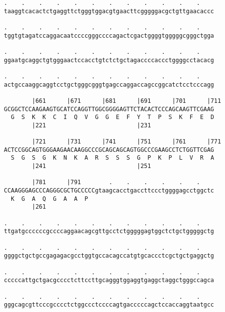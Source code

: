 \documentclass{article}
\begin{document}
\begin{Verbatim}
.    .    .    .    .    .    .    .    .    .    .    .    
taaggtcacactctgaggttctgggtggacgtgaacttcgggggacgctgttgaacaccc
                                                            
.    .    .    .    .    .    .    .    .    .    .    .    
tggtgtagatccaggacaatccccgggccccagactcgactggggtgggggcgggctgga
                                                            
.    .    .    .    .    .    .    .    .    .    .    .    
ggaatgcaggctgtgggaactccacctgtctctgctagaccccaccctggggcctacacg
                                                            
.    .    .    .    .    .    .    .    .    .    .    .    
actgccaaggcaggtcctgctgggcgggtgagccaggaccagccggcatctcctcccagg
                                                            
        |661      |671      |681      |691      |701      |711
GCGGCTCCAAGAAGTGCATCCAGGTTGGCGGGGAGTTCTACACTCCCAGCAAGTTCGAAG
  G  S  K  K  C  I  Q  V  G  G  E  F  Y  T  P  S  K  F  E  D
        |221                          |231                  
  
        |721      |731      |741      |751      |761      |771
ACTCCGGCAGTGGGAAGAACAAGGCCCGCAGCAGCAGTGGCCCGAAGCCTCTGGTTCGAG
  S  G  S  G  K  N  K  A  R  S  S  S  G  P  K  P  L  V  R  A
        |241                          |251                  
  
        |781      |791        .    .    .    .    .    .    
CCAAGGGAGCCCAGGGCGCTGCCCCCgtaagcacctgaccttccctggggagcctggctc
  K  G  A  Q  G  A  A  P                                    
        |261                                                
  
.    .    .    .    .    .    .    .    .    .    .    .    
ttgatgccccccgccccaggaacagcgttgcctctgggggagtggctctgctgggggctg
                                                            
.    .    .    .    .    .    .    .    .    .    .    .    
ggggctgctgccgagagacgcctggtgccacagccatgtgcaccctcgctgctgaggctg
                                                            
.    .    .    .    .    .    .    .    .    .    .    .    
cccccattgctgacgcccctcttccttgcagggtggaggtgaggctaggctgggccagca
                                                            
.    .    .    .    .    .    .    .    .    .    .    .    
gggcagcgttcccgcccctctggccctccccagtgacccccagctccaccaggtaatgcc
                                                            

\end{Verbatim}
\end{document}
